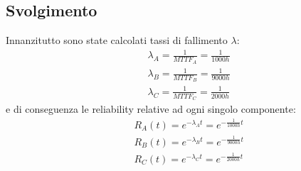 \subsection{Svolgimento}
Innanzitutto sono state calcolati tassi di fallimento $\lambda$:
\begin{equation*}
	\begin{split}
		&\lambda_A = \frac{1}{MTTF_A} = \frac{1}{1000h}\\
		&\lambda_B = \frac{1}{MTTF_B} = \frac{1}{9000h}\\
		&\lambda_C = \frac{1}{MTTF_C} = \frac{1}{2000h}
	\end{split}
\end{equation*}
e di conseguenza le reliability relative ad ogni singolo componente:
\begin{equation*}
	\begin{split}
		&R_A(t) = e^{-\lambda_A t} = e^{-\frac{1}{1000h} t}\\
		&R_B(t) = e^{-\lambda_B t} = e^{-\frac{1}{9000h} t}\\
		&R_C(t) = e^{-\lambda_C t} = e^{-\frac{1}{2000h} t}
	\end{split}
\end{equation*}
